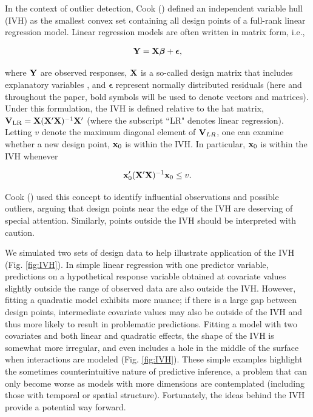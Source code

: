 \documentclass[12pt,english]{article}
\begin{document}
\begin{spacing}{1.9}
In the context of outlier detection, Cook (\citeyear{Cook1979}) defined an independent variable hull (IVH) as the smallest convex set containing all design points of a full-rank linear regression model.  Linear regression models are often written in matrix form, i.e.,
\begin{linenomath*}
\begin{equation*}
  {\bf Y} = {\bf X} \boldsymbol{\beta} + \boldsymbol{\epsilon},
\end{equation*}
\end{linenomath*}
where ${\bf Y}$ are observed responses, ${\bf X}$ is a so-called design matrix that includes explanatory variables \citep[see e.g.,][]{Draper1966}, and $\boldsymbol{\epsilon}$ represent normally distributed residuals (here and throughout the paper, bold symbols will be used to denote vectors and matrices).
Under this formulation, the IVH is defined relative to the hat matrix, ${\bf V}_{\rm LR}={\bf X}({\bf X}^\prime{\bf X})^{-1}{\bf X}^\prime$ (where the subscript ``LR" denotes linear regression).  Letting $v$ denote the maximum diagonal element of ${\bf V}_{LR}$, one can examine whether a new design point, ${\bf x}_0$ is within the IVH.  In particular, ${\bf x}_0$ is within the IVH whenever
\begin{linenomath*}
\begin{equation}
  \label{eq:IVH}
  {\bf x}_0^\prime ({\bf X}^\prime{\bf X})^{-1}{\bf x}_0 \le v.
\end{equation}
\end{linenomath*}
Cook (\citeyear{Cook1979}) used this concept to identify influential observations and possible outliers, arguing that design points near the edge of the IVH are deserving of special attention.  Similarly, points outside the IVH should be interpreted with caution.

We simulated two sets of design data to help illustrate application of the IVH (Fig. \ref{fig:IVH}).  In simple linear regression with one predictor variable, predictions on a hypothetical response variable obtained at covariate values slightly outside the range of observed data are also outside the IVH.  However, fitting a quadratic model exhibits more nuance; if there is a large gap between design points, intermediate covariate values may also be outside of the IVH and thus more likely to result in problematic predictions.  Fitting a model with two covariates and both linear and quadratic effects, the shape of the IVH is somewhat more irregular, and even includes a hole in the middle of the surface when interactions are modeled (Fig. \ref{fig:IVH}).  These simple examples highlight the sometimes counterintuitive nature of predictive inference, a problem that can only become worse as models with more dimensions are contemplated (including those with temporal or spatial structure).  Fortunately, the ideas behind the IVH provide a potential way forward.


\end{spacing}
\end{document}
